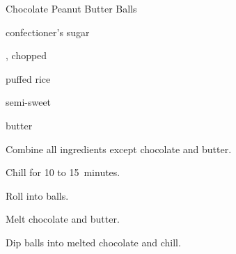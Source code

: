 \begin{recipe}{Chocolate Peanut Butter Balls}{}{}

\begin{ingredients}
\item {} 
\item {} confectioner's sugar
\item \C{\half} , chopped
\item \C{\half} puffed rice 
\item {} semi-sweet 
\item {} butter
\end{ingredients}

\begin{directions}
\item Combine all ingredients except chocolate and butter.
\item Chill for 10 to 15~minutes.
\item Roll into balls.
\item Melt chocolate and butter.
\item Dip balls into melted chocolate and chill.
\end{directions}
\end{recipe}
